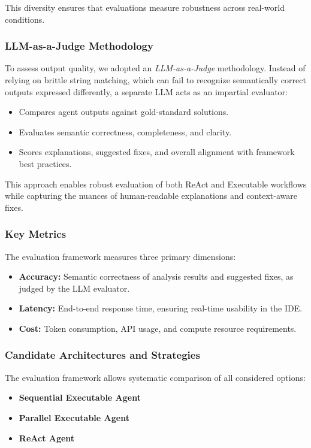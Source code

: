 \begin{spacing}{1.2}
This diversity ensures that evaluations measure robustness across real-world conditions.

\subsubsection{LLM-as-a-Judge Methodology}
To assess output quality, we adopted an \emph{LLM-as-a-Judge} methodology. Instead of relying on brittle string matching, which can fail to recognize semantically correct outputs expressed differently, a separate LLM acts as an impartial evaluator:

\begin{itemize}
    \item Compares agent outputs against gold-standard solutions.
    \item Evaluates semantic correctness, completeness, and clarity.
    \item Scores explanations, suggested fixes, and overall alignment with framework best practices.
\end{itemize}

This approach enables robust evaluation of both ReAct and Executable workflows while capturing the nuances of human-readable explanations and context-aware fixes.

\subsubsection{Key Metrics}
The evaluation framework measures three primary dimensions:

\begin{itemize}
    \item \textbf{Accuracy:} Semantic correctness of analysis results and suggested fixes, as judged by the LLM evaluator.
    \item \textbf{Latency:} End-to-end response time, ensuring real-time usability in the IDE.
    \item \textbf{Cost:} Token consumption, API usage, and compute resource requirements.
\end{itemize}

\subsubsection{Candidate Architectures and Strategies}
The evaluation framework allows systematic comparison of all considered options:

\begin{itemize}
    \item \textbf{Sequential Executable Agent}
    \item \textbf{Parallel Executable Agent}
    \item \textbf{ReAct Agent}
\end{itemize}


\end{spacing}
